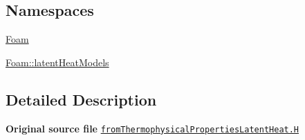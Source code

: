 \subsection*{Namespaces}
\begin{DoxyCompactItemize}
\item 
 \hyperlink{namespaceFoam}{Foam}
\item 
 \hyperlink{namespaceFoam_1_1latentHeatModels}{Foam\+::latent\+Heat\+Models}
\end{DoxyCompactItemize}


\subsection{Detailed Description}
{\bfseries Original source file} \href{../../../home/carlo/data/GeN-Foam/GeN-Foam_ffn/GeN-Foam/GeN-Foam/classes/thermalHydraulics/src/physicsModels/phaseChangeModels/latentHeatModels/fromThermophysicalProperties/fromThermophysicalPropertiesLatentHeat.H}{\tt from\+Thermophysical\+Properties\+Latent\+Heat.\+H} 